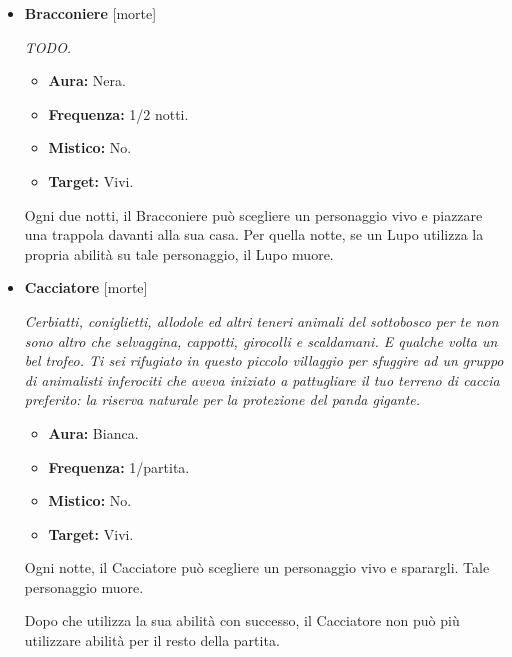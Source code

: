 \documentclass[a4paper,10pt]{article}
\begin{document}
\begin{itemize}
      \item \textbf{Bracconiere} [morte]

            \emph{TODO.}

            \begin{multicols}{2}
                  \begin{itemize}
                        \item \textbf{Aura:} Nera.
                        \item \textbf{Frequenza:} 1/2 notti.
                        \item \textbf{Mistico:} No.
                        \item \textbf{Target:} Vivi.
                  \end{itemize}
            \end{multicols}

            Ogni due notti, il Bracconiere può scegliere un personaggio vivo e piazzare una trappola davanti alla sua casa. Per quella notte, se un Lupo utilizza la propria abilità su tale personaggio, il Lupo muore.

      \item \textbf{Cacciatore} [morte]

            \emph{Cerbiatti, coniglietti, allodole ed altri teneri animali del sottobosco per te non sono altro che selvaggina, cappotti, girocolli e scaldamani. E qualche volta un bel trofeo. Ti sei rifugiato in questo piccolo villaggio per sfuggire ad un gruppo di animalisti inferociti che aveva iniziato a pattugliare il tuo terreno di caccia preferito: la riserva naturale per la protezione del panda gigante.}

            \begin{multicols}{2}
                  \begin{itemize}
                        \item \textbf{Aura:} Bianca.
                        \item \textbf{Frequenza:} 1/partita.
                        \item \textbf{Mistico:} No.
                        \item \textbf{Target:} Vivi.
                  \end{itemize}
            \end{multicols}

            Ogni notte, il Cacciatore può scegliere un personaggio vivo e sparargli. Tale personaggio muore.

            Dopo che utilizza la sua abilità con successo, il Cacciatore non può più utilizzare abilità per il resto della partita.


\end{itemize}
\end{document}
